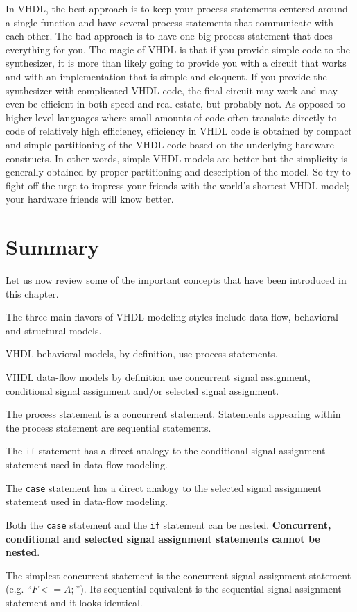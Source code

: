 In VHDL, the best approach is to keep your process statements centered around a single function and have several process statements that communicate with each other. The bad approach is to have one big process statement that does everything for you. The magic of VHDL is that if you provide simple code to the synthesizer, it is more than likely going to provide you with a circuit that works and with an implementation that is simple and eloquent. If you provide the synthesizer with complicated VHDL code, the final circuit may work and may even be efficient in both speed and real estate, but probably not. As opposed to higher-level languages where small amounts of code often translate directly to code of relatively high efficiency, efficiency in VHDL code is obtained by compact and simple partitioning of the VHDL code based on the underlying hardware constructs. In other words, simple VHDL models are better but the simplicity is generally obtained by proper partitioning and description of the model. So try to fight off the urge to impress your friends with the world's shortest VHDL model; your hardware friends will know better.
\section{Summary}
Let us now review some of the important concepts that have been introduced in this chapter.
\begin{my_list}
\item The three main flavors of VHDL modeling styles include data-flow, behavioral and structural models.
\item VHDL behavioral models, by definition, use process statements.
\item VHDL data-flow models by definition use concurrent signal assignment, conditional signal assignment and/or selected signal assignment.
\item The process statement is a concurrent statement. Statements appearing within the process statement are sequential statements.
\item The \texttt{if} statement has a direct analogy to the conditional signal assignment statement used in data-flow modeling.
\item The \texttt{case} statement has a direct analogy to the selected signal assignment statement used in data-flow modeling.
\item Both the \texttt{case} statement and the \texttt{if} statement can be nested. \textbf{Concurrent, conditional and selected signal assignment statements cannot be nested}.
\item The simplest concurrent statement is the concurrent signal assignment statement (e.g. ``{\footnotesize$F <= A;$}''). Its sequential equivalent is the sequential signal assignment statement and it looks identical.
\end{my_list}

